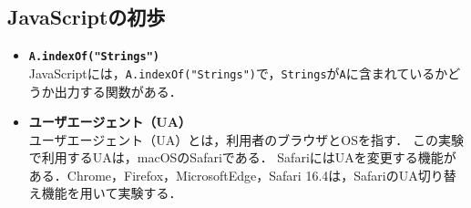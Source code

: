 \subsection{JavaScriptの初歩}
\begin{itemize}
    \item \textbf{\texttt{A.indexOf("Strings")}}\\
          JavaScriptには，\texttt{A.indexOf("Strings")}で，\texttt{Strings}が\texttt{A}に含まれているかどうか出力する関数がある．
    \item \textbf{ユーザエージェント（UA）}\\
          ユーザエージェント（UA）とは，利用者のブラウザとOSを指す．
          この実験で利用するUAは，macOSのSafariである．
          SafariにはUAを変更する機能がある．Chrome，Firefox，MicrosoftEdge，Safari 16.4は，SafariのUA切り替え機能を用いて実験する．
\end{itemize}

